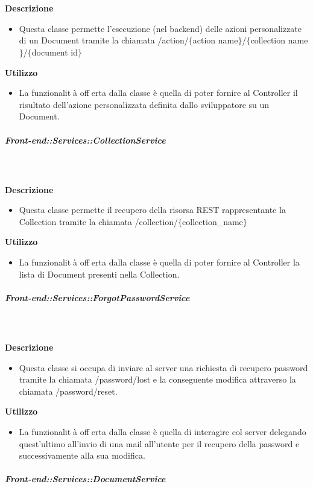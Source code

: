 \begin{itemize}
        \textbf{\\ \\ Descrizione} 
          \begin{itemize}
            \item[] Questa classe permette l'esecuzione (nel backend) delle azioni personalizzate di un Document tramite la chiamata /action/$\{$action name$\}$/$\{$collection name$\}$/$\{$document id$\}$
          \end{itemize}      
        \textbf{Utilizzo}  
          \begin{itemize}
            \item[] La funzionalità offerta dalla classe è quella di poter fornire al Controller il risultato dell'azione personalizzata definita dallo sviluppatore su un Document.
          \end{itemize}
      \subparagraph{Front-end::Services::CollectionService}
        
        \textbf{\\ \\ Descrizione} 
          \begin{itemize}
            \item[] Questa classe permette il recupero della risorsa REST rappresentante la Collection tramite la chiamata  /collection/$\{$collection_name$\}$
          \end{itemize}      
        \textbf{Utilizzo}  
          \begin{itemize}
            \item[] La funzionalità offerta dalla classe è quella di poter fornire al Controller la lista di Document presenti nella Collection.
          \end{itemize}
      \subparagraph{Front-end::Services::ForgotPasswordService}
        
        \textbf{\\ \\ Descrizione} 
          \begin{itemize}
            \item[] Questa classe si occupa di inviare al server una richiesta di recupero password tramite la chiamata /password/lost e la conseguente modifica attraverso la chiamata /password/reset.
          \end{itemize}      
        \textbf{Utilizzo}  
          \begin{itemize}
            \item[] La funzionalità offerta dalla classe è quella di interagire col server delegando quest'ultimo all'invio di una mail all'utente per il recupero della password e successivamente alla sua modifica.
          \end{itemize}
      \subparagraph{Front-end::Services::DocumentService}
        

\end{itemize}
